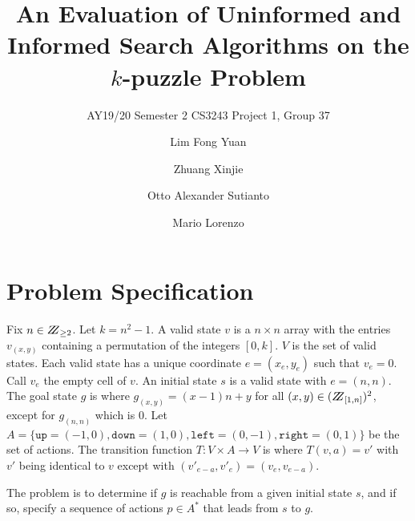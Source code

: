 \documentclass[runningheads]{llncs}
\begin{document}
%
\title{An Evaluation of Uninformed and Informed Search Algorithms on the $k$-puzzle Problem}
\subtitle{AY19/20 Semester 2 CS3243 Project 1, Group 37}
%
%
\author{Lim Fong Yuan \and
Zhuang Xinjie \and
Otto Alexander Sutianto \and
Mario Lorenzo}
%
%
%
\maketitle              %
%

%
%
%
\section{Problem Specification}
Fix $n \in \bbbz_{\geq 2}$. Let $k = n^2 -1$.
A valid state $v$ is a $n \times n$ array with the entries $v_{(x,y)}$ containing a permutation of the integers $[0,k]$. $V$ is the set of valid states.
Each valid state has a unique coordinate $e = (x_e,y_e)$ such that $v_e = 0$. Call $v_e$ the empty cell of $v$.
An initial state $s$ is a valid state with $e = (n,n)$.
The goal state $g$ is where $g_{(x,y)} = (x-1)n+y$ for all $(x,y) \in (\bbbz_{[1,n]})^2$, except for $g_{(n,n)}$ which is $0$.
Let $A = \{\texttt{up}=(-1,0),\texttt{down}=(1,0),\texttt{left}=(0,-1),\texttt{right}=(0,1)\}$ be the set of actions.
The transition function $T: V \times A \to V$ is where $T(v,a) = v'$ with $v'$ being identical to $v$ except with $(v'_{e-a},v'_e) = (v_e,v_{e-a})$.%

The problem is to determine if $g$ is reachable from a given initial state $s$, and if so, specify a sequence of actions $p \in A^\ast$ that leads from $s$ to $g$.
\end{document}
